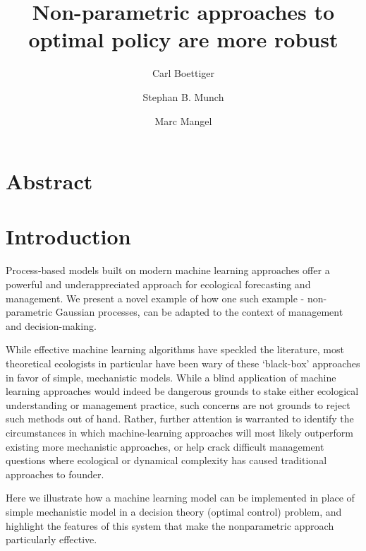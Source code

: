 \documentclass[author-year, review]{elsarticle} %
\begin{document}
\begin{frontmatter}
  \title{Non-parametric approaches to optimal policy are more robust}
  \author[cstar]{Carl Boettiger}
  \author[noaa]{Stephan B. Munch}
  \author[cstar]{Marc Mangel}
  \address[cstar]{Center for Stock Assessment Research, Department of Applied Math and Statistics, University of California, Mail Stop SOE-2, Santa Cruz, CA 95064, USA}
  \address[noaa]{Southwest Fisheries Science Center, National Oceanic and Atmospheric Administration, 110 Shaffer Road, Santa Cruz, CA 95060, USA}
 \end{frontmatter}


\section{Abstract}

\section{Introduction}

Process-based models built on modern machine learning approaches offer a
powerful and underappreciated approach for ecological forecasting and
management. We present a novel example of how one such example -
non-parametric Gaussian processes, can be adapted to the context of
management and decision-making.

While effective machine learning algorithms have speckled the
literature, most theoretical ecologists in particular have been wary of
these `black-box' approaches in favor of simple, mechanistic models.
While a blind application of machine learning approaches would indeed be
dangerous grounds to stake either ecological understanding or management
practice, such concerns are not grounds to reject such methods out of
hand. Rather, further attention is warranted to identify the
circumstances in which machine-learning approaches will most likely
outperform existing more mechanistic approaches, or help crack difficult
management questions where ecological or dynamical complexity has caused
traditional approaches to founder.

Here we illustrate how a machine learning model can be implemented in
place of simple mechanistic model in a decision theory (optimal control)
problem, and highlight the features of this system that make the
nonparametric approach particularly effective.
\end{document}
